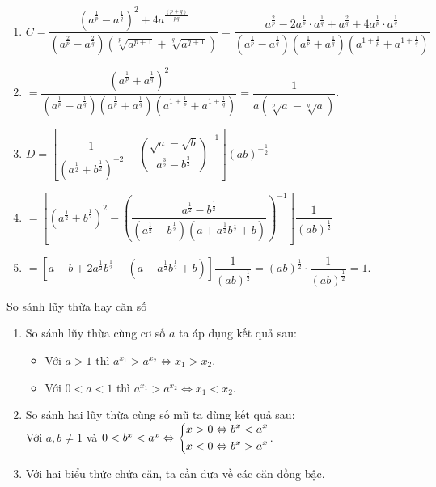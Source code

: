 \begin{bt}
{\begin{enumerate}
			\item $C=\dfrac{\left(a^{\frac{1}{p}}-a^{\frac{1}{q}}\right)^2+4a^{\frac{(p+q)}{pq}}}{\left(a^{\frac{2}{p}}-a^{\frac{2}{q}}\right)\left(\sqrt[p]{a^{p+1}}+\sqrt[q]{a^{q+1}}\right)}=\dfrac{a^{\frac{2}{p}}-2a^{\frac{1}{p}}\cdot a^{\frac{1}{q}}+a^{\frac{2}{q}}+4a^{\frac{1}{p}}\cdot a^{\frac{1}{q}}}{\left(a^{\frac{1}{p}}-a^{\frac{1}{q}}\right)\left(a^{\frac{1}{p}}+a^{\frac{1}{q}}\right)\left(a^{1+\frac{1}{p}}+a^{1+\frac{1}{q}}\right)}$
			\item[] $=\dfrac{\left(a^{\frac{1}{p}}+a^{\frac{1}{q}}\right)^2}{\left(a^{\frac{1}{p}}-a^{\frac{1}{q}}\right)\left(a^{\frac{1}{p}}+a^{\frac{1}{q}}\right)\left(a^{1+\frac{1}{p}}+a^{1+\frac{1}{q}}\right)}=\dfrac{1}{a\left(\sqrt[p]{a}-\sqrt[q]{a}\right)}.$
			
			\item $D=\left[\dfrac{1}{(a^{\frac{1}{2}}+b^{\frac{1}{2}})^{-2}}-\left( \dfrac{\sqrt{a}-\sqrt{b}}{a^{\frac{3}{2}}-b^{\frac{3}{2}}}\right)^{-1}\right](ab)^{-\frac{1}{2}}$
			\item[] $=\left[(a^{\frac{1}{2}}+b^{\frac{1}{2}})^2-\left(\dfrac{a^{\frac{1}{2}}-b^{\frac{1}{2}}}{\left(a^{\frac{1}{2}}-b^{\frac{1}{2}}\right)\left(a+a^{\frac{1}{2}}b^{\frac{1}{2}}+b\right)}\right)^{-1}\right] \dfrac{1}{(ab)^{\frac{1}{2}}}$
			\item[] $=\left[a+b+2a^{\frac{1}{2}}b^{\frac{1}{2}}-\left(a+a^{\frac{1}{2}}b^{\frac{1}{2}}+b\right)\right] \dfrac{1}{(ab)^{\frac{1}{2}}}=(ab)^{\frac{1}{2}}\cdot \dfrac{1}{(ab)^{\frac{1}{2}}}=1.$
		\end{enumerate}
	}
\end{bt}


\begin{dang}{So sánh lũy thừa hay căn số}
\begin{enumerate}
\item So sánh lũy thừa cùng cơ số $a$ ta áp dụng kết quả sau:
\begin{itemize}
\item Với $a>1$ thì $a^{x_1}>a^{x_2}\Leftrightarrow x_1>x_2$.
\item Với $0<a<1$ thì $a^{x_1}>a^{x_2}\Leftrightarrow x_1<x_2$.
\end{itemize}
\item So sánh hai lũy thừa cùng số mũ ta dùng kết quả sau:\\
Với $a,b\neq 1$ và $0<b^x<a^x\Leftrightarrow\left\{\begin{aligned}&x>0\Leftrightarrow b^x<a^x\\&x<0\Leftrightarrow b^x>a^x\end{aligned}\right.$.
\item Với hai biểu thức chứa căn, ta cần đưa về các căn đồng bậc.
\end{enumerate}
\end{dang}

